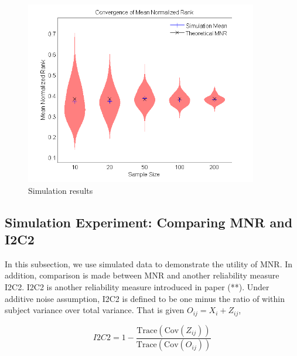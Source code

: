 \documentclass[11pt,journal,compsoc]{IEEEtran}
\begin{document}
\begin{figure}[t!]
\begin{center}
\includegraphics[width=4in]{simumnr_violin}
\end{center}
\caption{Simulation results}
\end{figure}

\subsection{Simulation Experiment: Comparing MNR and I2C2}
\noindent In this subsection, we use simulated data to demonstrate the utility of MNR. In addition, comparison is made between MNR and another reliability measure I2C2. I2C2 is another reliability measure introduced in paper (**). Under additive noise assumption, I2C2 is defined to be one minus the ratio of within subject variance over total variance. That is given $O_{ij}=X_i+Z_{ij}$,
 
\[ I2C2=1-\frac{\text{Trace}(\text{Cov}(Z_{ij}))}{\text{Trace}(\text{Cov}(O_{ij}))} \]
\end{document}
